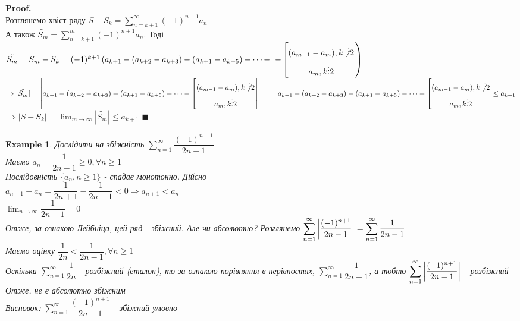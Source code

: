 \documentclass[a4paper, 14pt]{extarticle}
\def\huge{\displaystyle}
\theoremstyle{theoremdd}
\theoremstyle{theoremdd}
\theoremstyle{theoremdd}
\theoremstyle{theoremdd}
\newtheorem{example}[theorem]{Example}
\theoremstyle{theoremdd}
\theoremstyle{theoremdd}
\theoremstyle{theoremdd}
\theoremstyle{theoremdd}
\newenvironment{pf}{\vspace*{-3mm} \textbf{Proof. \\}}{$\blacksquare$}
\begin{document}
\begin{pf}
Розглянемо хвіст ряду $S-S_k = \huge \sum_{n=k+1}^{\infty} (-1)^{n+1}a_n$\\
А також $\tilde{S_m} = \huge \sum_{n=k+1}^{m} (-1)^{n+1}a_n$. Тоді\\
$\tilde{S_m} = S_m - S_k = (-1)^{k+1} \left(a_{k+1}-(a_{k+2}-a_{k+3})-(a_{k+1}-a_{k+5}) - \dots - \right. \\ \left. - \left[ \begin{gathered} (a_{m-1}-a_m), k \not \vdots 2 \\ a_m, k \vdots 2 \end{gathered} \right. \right)$\\
$\Rightarrow |\tilde{S_m}| = \left|a_{k+1}-(a_{k+2}-a_{k+3})-(a_{k+1}-a_{k+5}) - \dots - \left[ \begin{gathered} (a_{m-1}-a_m), k \not \vdots 2 \\ a_m, k \vdots 2 \end{gathered} \right. \right| = \\
= a_{k+1}-(a_{k+2}-a_{k+3})-(a_{k+1}-a_{k+5}) - \dots - \left[ \begin{gathered} (a_{m-1}-a_m), k \not \vdots 2 \\ a_m, k \vdots 2 \end{gathered} \right. \leq a_{k+1}$\\
$\Rightarrow |S - S_k| = \huge \lim_{m \to \infty} |\tilde{S_m}| \leq a_{k+1}$ \end{pf}

\begin{example}
Дослідити на збіжність $\huge\sum_{n=1}^\infty \dfrac{(-1)^{n+1}}{2n-1}$\\
Маємо $a_n = \dfrac{1}{2n-1} \geq 0, \forall n \geq 1$\\
Послідовність $\{a_n, n \geq 1\}$ - спадає монотонно. Дійсно\\
$a_{n+1} - a_n = \dfrac{1}{2n+1} - \dfrac{1}{2n-1} < 0 \Rightarrow a_{n+1} < a_n$\\
$\huge\lim_{n \to \infty} \dfrac{1}{2n-1} = 0$\\
Отже, за ознакою Лейбніца, цей ряд - збіжний. Але чи абсолютно?
Розглянемо $\huge\sum_{n=1}^\infty \abs{\dfrac{(-1)^{n+1}}{2n-1}} = \huge\sum_{n=1}^\infty \dfrac{1}{2n-1}$\\
Маємо оцінку $\dfrac{1}{2n} < \dfrac{1}{2n-1}, \forall n \geq 1$\\
Оскільки $\huge\sum_{n=1}^\infty \dfrac{1}{2n}$ - розбіжний (еталон), то за ознакою порівняння в нерівностях, $\huge\sum_{n=1}^\infty \dfrac{1}{2n-1}$, а тобто $\huge\sum_{n=1}^\infty \abs{\dfrac{(-1)^{n+1}}{2n-1}}$ - розбіжний\\
Отже, не є абсолютно збіжним\\
Висновок: $\huge\sum_{n=1}^\infty \dfrac{(-1)^{n+1}}{2n-1}$ - збіжний умовно
\\
\end{example}
\end{document}
